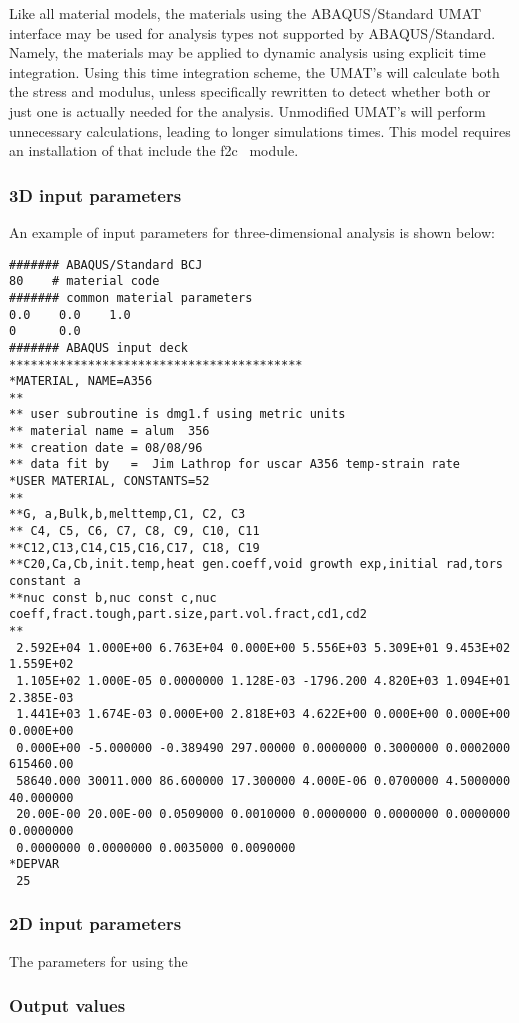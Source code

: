 Like all material models, the materials using the 
\textsf{ABAQUS/Standard UMAT} interface may be used for 
analysis types not supported by \textsf{ABAQUS/Standard}. Namely, the 
materials may be applied to dynamic analysis using explicit time 
integration. Using this time integration scheme, the \textsf{UMAT}'s
will calculate both the stress and modulus, unless specifically 
rewritten to detect whether both or just one is actually needed for 
the analysis. Unmodified \textsf{UMAT}'s will perform unnecessary 
calculations, leading to longer simulations times.
This model requires an installation of \tahoe that include the 
\textsf{f2c}~\cite{f2c} module. 

\subsubsection{3D input parameters}
An example of input parameters for three-dimensional analysis is shown 
below:
\begin{verbatim}
####### ABAQUS/Standard BCJ	
80    # material code
####### common material parameters
0.0    0.0    1.0
0      0.0
####### ABAQUS input deck
*****************************************
*MATERIAL, NAME=A356
**
** user subroutine is dmg1.f using metric units
** material name = alum  356                                               
** creation date = 08/08/96                                                    
** data fit by   =  Jim Lathrop for uscar A356 temp-strain rate
*USER MATERIAL, CONSTANTS=52
**
**G, a,Bulk,b,melttemp,C1, C2, C3
** C4, C5, C6, C7, C8, C9, C10, C11
**C12,C13,C14,C15,C16,C17, C18, C19
**C20,Ca,Cb,init.temp,heat gen.coeff,void growth exp,initial rad,tors constant a
**nuc const b,nuc const c,nuc coeff,fract.tough,part.size,part.vol.fract,cd1,cd2
**
 2.592E+04 1.000E+00 6.763E+04 0.000E+00 5.556E+03 5.309E+01 9.453E+02 1.559E+02
 1.105E+02 1.000E-05 0.0000000 1.128E-03 -1796.200 4.820E+03 1.094E+01 2.385E-03
 1.441E+03 1.674E-03 0.000E+00 2.818E+03 4.622E+00 0.000E+00 0.000E+00 0.000E+00
 0.000E+00 -5.000000 -0.389490 297.00000 0.0000000 0.3000000 0.0002000 615460.00
 58640.000 30011.000 86.600000 17.300000 4.000E-06 0.0700000 4.5000000 40.000000
 20.00E-00 20.00E-00 0.0509000 0.0010000 0.0000000 0.0000000 0.0000000 0.0000000
 0.0000000 0.0000000 0.0035000 0.0090000
*DEPVAR
 25
\end{verbatim}
	

\subsubsection{2D input parameters}
The parameters for using the 

\subsubsection{Output values}


